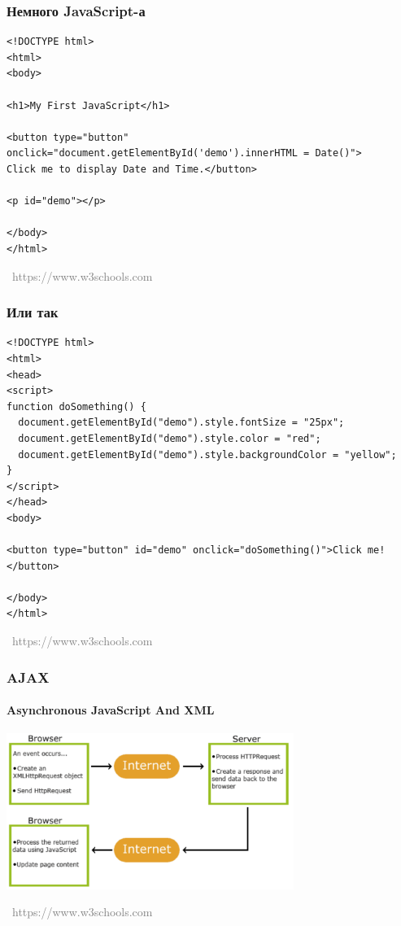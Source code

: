 \documentclass[xetex,mathserif,serif]{beamer}
\newcommand{\attribution}[1] {
\vspace{-5mm}\begin{flushright}\begin{scriptsize}\textcolor{gray}{\textcopyright\, #1}\end{scriptsize}\end{flushright}
}
\begin{document}
    \begin{frame}[fragile]
        \frametitle{Немного JavaScript-а}
        \begin{verbatim}
<!DOCTYPE html>
<html>
<body>

<h1>My First JavaScript</h1>

<button type="button"
onclick="document.getElementById('demo').innerHTML = Date()">
Click me to display Date and Time.</button>

<p id="demo"></p>

</body>
</html> 
        \end{verbatim}
        \attribution{https://www.w3schools.com}
    \end{frame}

    \begin{frame}[fragile]
        \frametitle{Или так}
        \begin{small}
            \begin{verbatim}
<!DOCTYPE html>
<html>
<head>
<script>
function doSomething() {
  document.getElementById("demo").style.fontSize = "25px";
  document.getElementById("demo").style.color = "red";
  document.getElementById("demo").style.backgroundColor = "yellow";
}
</script>
</head>
<body>

<button type="button" id="demo" onclick="doSomething()">Click me!</button>

</body>
</html>
            \end{verbatim}
        \end{small}
        \vspace{-3mm}
        \attribution{https://www.w3schools.com}
    \end{frame}

    \begin{frame}
        \frametitle{AJAX}
        \framesubtitle{Asynchronous JavaScript And XML}
        \begin{center}
            \includegraphics[width=0.7\textwidth]{ajax.png}
        \end{center}
        \attribution{https://www.w3schools.com}
    \end{frame}
\end{document}
